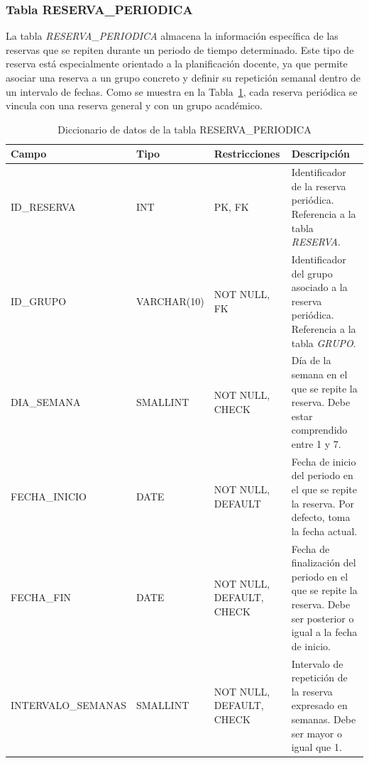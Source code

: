 \subsubsection{Tabla RESERVA\_PERIODICA}

 La tabla \textit{RESERVA\_PERIODICA} almacena la información específica de las reservas que se repiten durante un periodo de tiempo determinado. Este tipo de reserva está especialmente orientado a la planificación docente, ya que permite asociar una reserva a un grupo concreto y definir su repetición semanal dentro de un intervalo de fechas. Como se muestra en la Tabla~\ref{tab:diccionario-reserva-periodica}, cada reserva periódica se vincula con una reserva general y con un grupo académico.\\

\begin{table}[H]
	\centering
	\scriptsize
	\setlength{\tabcolsep}{3pt}
	\renewcommand{\arraystretch}{1.15}
	\begin{tabularx}{\textwidth}{@{}
			>{\raggedright\arraybackslash}p{2.6cm}
			>{\raggedright\arraybackslash}p{2.2cm}
			>{\raggedright\arraybackslash}p{2.2cm}
			X@{}}
		\toprule
		\textbf{Campo} & \textbf{Tipo} & \textbf{Restricciones} & \textbf{Descripción} \\
		\midrule
		ID\_\newline RESERVA & INT & PK, FK & Identificador de la reserva periódica. Referencia a la tabla \textit{RESERVA}. \\
		ID\_\newline GRUPO & VARCHAR(10) & NOT NULL, FK & Identificador del grupo asociado a la reserva periódica. Referencia a la tabla \textit{GRUPO}. \\
		DIA\_\newline SEMANA & SMALLINT & NOT NULL, CHECK & Día de la semana en el que se repite la reserva. Debe estar comprendido entre 1 y 7. \\
		FECHA\_\newline INICIO & DATE & NOT NULL, DEFAULT & Fecha de inicio del periodo en el que se repite la reserva. Por defecto, toma la fecha actual. \\
		FECHA\_FIN & DATE & NOT NULL, DEFAULT, CHECK & Fecha de finalización del periodo en el que se repite la reserva. Debe ser posterior o igual a la fecha de inicio. \\
		INTERVALO\_\newline SEMANAS & SMALLINT & NOT NULL, DEFAULT, CHECK & Intervalo de repetición de la reserva expresado en semanas. Debe ser mayor o igual que 1. \\
		\bottomrule
	\end{tabularx}
	\caption{Diccionario de datos de la tabla RESERVA\_PERIODICA}
	\label{tab:diccionario-reserva-periodica}
\end{table}

